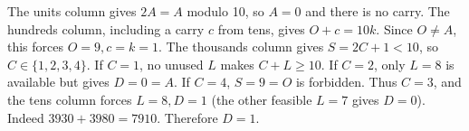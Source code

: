 The units column gives $2A=A$ modulo 10, so $A=0$ and there is no carry. The hundreds column, including a carry $c$ from tens, gives $O+c=10k$. Since $O\ne A$, this forces $O=9,c=k=1$. The thousands column gives $S=2C+1<10$, so $C\in\{1,2,3,4\}$. If $C=1$, no unused $L$ makes $C+L\ge10$. If $C=2$, only $L=8$ is available but gives $D=0=A$. If $C=4$, $S=9=O$ is forbidden. Thus $C=3$, and the tens column forces $L=8,D=1$ (the other feasible $L=7$ gives $D=0$). Indeed $3930+3980=7910$. Therefore $\boxed{D=1}$.
